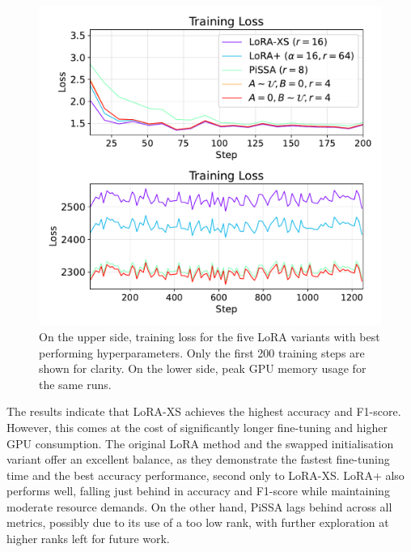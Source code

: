 \documentclass[a4paper,10pt,twocolumn,english]{article}
\begin{document}
\begin{figure}[ht]
    \centering
    \includegraphics[width=1\linewidth]{../plots/train_loss_and_gpu_mem_final.pdf}
    \caption{On the upper side, training loss for the five LoRA variants with best performing hyperparameters. Only the first 200 training steps are shown for clarity. On the lower side, peak GPU memory usage for the same runs.}
    \label{fig:train_loss_gpu_mem}
\end{figure}

The results indicate that LoRA-XS achieves the highest accuracy and F1-score. However, this comes at the cost of significantly longer fine-tuning and higher GPU consumption. The original LoRA method and the swapped initialisation variant offer an excellent balance, as they demonstrate the fastest fine-tuning time and the best accuracy performance, second only to LoRA-XS. LoRA+ also performs well, falling just behind in accuracy and F1-score while maintaining moderate resource demands. On the other hand, PiSSA lags behind across all metrics, possibly due to its use of a too low rank, with further exploration at higher ranks left for future work.
\end{document}
